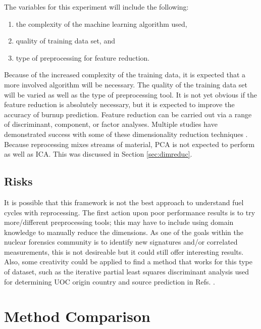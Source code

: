 The variables for this experiment will include the following:
\begin{enumerate}
  \itemsep-0.75em
  \item the complexity of the machine learning algorithm used,
  \item quality of training data set, and 
  \item type of preprocessing for feature reduction.
\end{enumerate}

Because of the increased complexity of the training data, it is expected that a
more involved algorithm will be necessary.  The quality of the training data
set will be varied as well as the type of preprocessing tool.  It is not yet
obvious if the feature reduction is absolutely necessary, but it is expected to
improve the accuracy of burnup prediction.  Feature reduction can
be carried out via a range of discriminant, component, or factor analyses.
Multiple studies have demonstrated success with some of these dimensionality
reduction techniques \cite{nicolaou_2006, nicolaou_2009, nicolaou_2014,
robel_2009, pu_discrimination, jones_viz_2014, jones_snf_2014}.  Because
reprocessing mixes streams of material, \gls{PCA} is not expected to perform as
well as \gls{ICA}. This was discussed in Section \ref{sec:dimreduc}.

\subsection*{Risks}

It is possible that this framework is not the best approach to understand fuel
cycles with reprocessing. The first action upon poor performance results is to
try more/different preprocessing tools; this may have to include using domain
knowledge to manually reduce the dimensions. As one of the goals within the
nuclear forensics community is to identify new signatures and/or correlated
measurements, this is not desireable but it could still offer interesting
results. Also, some creativity could be applied to find a method that works for
this type of dataset, such as the iterative partial least squares discriminant
analysis used for determining \gls{UOC} origin country and source prediction in
Refs.  \cite{robel_2009, pu_discrimination}.

\section{Method Comparison}
\label{sec:modelcompare}

